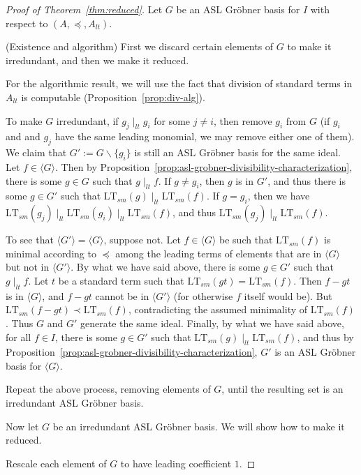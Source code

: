 \documentclass[11pt,reqno]{amsart}
\newcommand{\ltdivides}{\mid_{lt}}
\newcommand{\ltsm}{\text{LT}_{sm}}
\theoremstyle{definition}
\numberwithin{equation}{section}
\begin{document}
\begin{proof}[Proof of Theorem~\ref{thm:reduced}]
Let $G$ be an ASL Gröbner basis for $I$ with respect to $(A,\preceq, A_{lt})$. 

(Existence and algorithm) First we discard certain elements of $G$ to make it irredundant, and then we make it reduced.

For the algorithmic result, we will use the fact that division of standard terms in $A_{lt}$ is computable (Proposition~\ref{prop:div-alg}). 

To make $G$ irredundant, if $g_j \ltdivides g_i$ for some $j \neq i$, then remove $g_i$ from $G$ (if $g_i$ and and $g_j$ have the same leading monomial, we may remove either one of them). We claim that $G' := G \backslash \{g_i\}$ is still an ASL Gröbner basis for the same ideal. Let $f \in \langle G \rangle$. Then by Proposition~\ref{prop:asl-grobner-divisibility-characterization}, there is some $g \in G$ such that $g \ltdivides f$. If $g \neq g_i$, then $g$ is in $G'$, and thus there is some $g \in G'$ such that $\ltsm(g) \ltdivides \ltsm(f)$. If $g = g_i$, then we have $\ltsm(g_j) \ltdivides \ltsm(g_i) \ltdivides \ltsm(f)$, and thus $\ltsm(g_j) \ltdivides \ltsm(f)$. 

To see that $\langle G' \rangle = \langle G \rangle$, suppose not. Let $f \in \langle G \rangle$ be such that $\ltsm(f)$ is minimal according to $\preceq$ among the leading terms of elements that are in $\langle G \rangle$ but not in $\langle G' \rangle$. By what we have said above, there is some $g \in G'$ such that $g \ltdivides f$. Let $t$ be a standard term such that $\ltsm(gt) = \ltsm(f)$. Then $f-gt$ is in $\langle G \rangle$, and $f-gt$ cannot be in $\langle G' \rangle$ (for otherwise $f$ itself would be). But $\ltsm(f-gt) \prec \ltsm(f)$, contradicting the assumed minimality of $\ltsm(f)$. Thus $G$ and $G'$ generate the same ideal. Finally, by what we have said above, for all $f \in I$, there is some $g \in G'$ such that $\ltsm(g) \ltdivides \ltsm(f)$, and thus by Proposition~\ref{prop:asl-grobner-divisibility-characterization}, $G'$ is an ASL Gröbner basis for $\langle G \rangle$.

Repeat the above process, removing elements of $G$, until the resulting set is an irredundant ASL Gröbner basis.

Now let $G$ be an irredundant ASL Gröbner basis. We will show how to make it reduced.

Rescale each element of $G$ to have leading coefficient $1$.


\end{proof}
\end{document}
